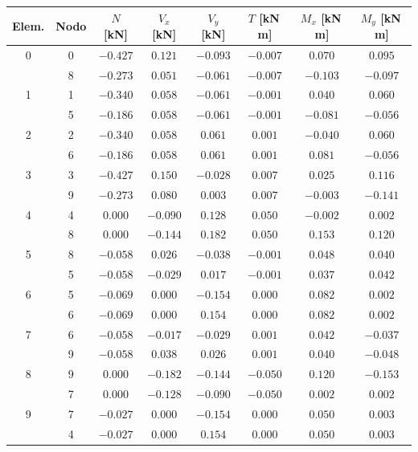 \documentclass[11pt,a4paper]{article}
\begin{document}
\begin{center}
\begin{minipage}{\linewidth}
\centering
{}\label{tab:viga3d-internas}
\begin{tabular}{@{}cccccccc@{}}
\toprule
Elem. & Nodo & $N$ [kN] & $V_x$ [kN] & $V_y$ [kN] & $T$ [kN\,m] & $M_x$ [kN\,m] & $M_y$ [kN\,m] \\
\midrule
0 & 0 & $-0.427$ & $0.121$ & $-0.093$ & $-0.007$ & $0.070$ & $0.095$ \\
 & 8 & $-0.273$ & $0.051$ & $-0.061$ & $-0.007$ & $-0.103$ & $-0.097$ \\
1 & 1 & $-0.340$ & $0.058$ & $-0.061$ & $-0.001$ & $0.040$ & $0.060$ \\
 & 5 & $-0.186$ & $0.058$ & $-0.061$ & $-0.001$ & $-0.081$ & $-0.056$ \\
2 & 2 & $-0.340$ & $0.058$ & $0.061$ & $0.001$ & $-0.040$ & $0.060$ \\
 & 6 & $-0.186$ & $0.058$ & $0.061$ & $0.001$ & $0.081$ & $-0.056$ \\
3 & 3 & $-0.427$ & $0.150$ & $-0.028$ & $0.007$ & $0.025$ & $0.116$ \\
 & 9 & $-0.273$ & $0.080$ & $0.003$ & $0.007$ & $-0.003$ & $-0.141$ \\
4 & 4 & $0.000$ & $-0.090$ & $0.128$ & $0.050$ & $-0.002$ & $0.002$ \\
 & 8 & $0.000$ & $-0.144$ & $0.182$ & $0.050$ & $0.153$ & $0.120$ \\
5 & 8 & $-0.058$ & $0.026$ & $-0.038$ & $-0.001$ & $0.048$ & $0.040$ \\
 & 5 & $-0.058$ & $-0.029$ & $0.017$ & $-0.001$ & $0.037$ & $0.042$ \\
6 & 5 & $-0.069$ & $0.000$ & $-0.154$ & $0.000$ & $0.082$ & $0.002$ \\
 & 6 & $-0.069$ & $0.000$ & $0.154$ & $0.000$ & $0.082$ & $0.002$ \\
7 & 6 & $-0.058$ & $-0.017$ & $-0.029$ & $0.001$ & $0.042$ & $-0.037$ \\
 & 9 & $-0.058$ & $0.038$ & $0.026$ & $0.001$ & $0.040$ & $-0.048$ \\
8 & 9 & $0.000$ & $-0.182$ & $-0.144$ & $-0.050$ & $0.120$ & $-0.153$ \\
 & 7 & $0.000$ & $-0.128$ & $-0.090$ & $-0.050$ & $0.002$ & $0.002$ \\
9 & 7 & $-0.027$ & $0.000$ & $-0.154$ & $0.000$ & $0.050$ & $0.003$ \\
 & 4 & $-0.027$ & $0.000$ & $0.154$ & $0.000$ & $0.050$ & $0.003$ \\
\bottomrule
\end{tabular}
\end{minipage}
\end{center}
\end{document}
